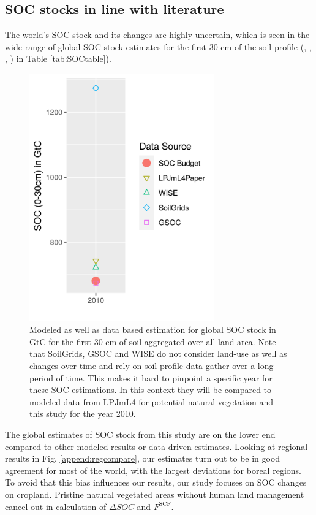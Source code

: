 \documentclass[gc, manuscript]{copernicus}
\begin{document}
\hypertarget{soc-stocks-in-line-with-literature}{%
\subsection{SOC stocks in line with literature}\label{soc-stocks-in-line-with-literature}}

The world's SOC stock and its changes are highly uncertain, which is seen in the wide range of global SOC stock estimates for the first 30 cm of the soil profile (\citep{batjes_harmonized_2016}, \citep{hengl_soilgrids250m_2017}, \citep{fao_global_2018}, \citep{schaphoff_lpjml4_2018-1}) in Table \ref{tab:SOCtable}).

\begin{figure}[h]
\includegraphics[width=8cm]{../ResultNotebooks/Output/Images/glo_comparisonfigure} \caption{Modeled as well as data based estimation for global SOC stock in GtC for the first 30 cm of soil aggregated over all land area. Note that SoilGrids, GSOC and WISE do not consider land-use as well as changes over time and rely on soil profile data gather over a long period of time. This makes it hard to pinpoint a specific year for these SOC estimations. In this context they will be compared to modeled data from LPJmL4 for potential natural vegetation and this study for the year 2010.}\label{fig:SOCtable}
\end{figure}

The global estimates of SOC stock from this study are on the lower end compared to other modeled results or data driven estimates. Looking at regional results in Fig. \ref{append:regcompare}, our estimates turn out to be in good agreement for most of the world, with the largest deviations for boreal regions. To avoid that this bias influences our results, our study focuses on SOC changes on cropland. Pristine natural vegetated areas without human land management cancel out in calculation of \(\Delta SOC\) and \(F^\mathrm{SCF}\).
\end{document}
